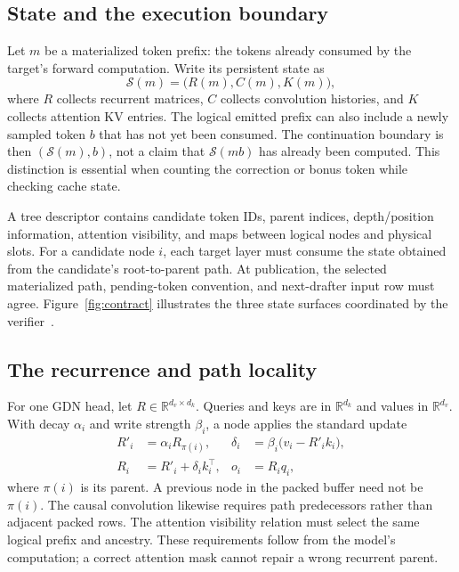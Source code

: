 \documentclass[conference]{IEEEtran}
\begin{document}
\subsection{State and the execution boundary}
Let $m$ be a materialized token prefix: the tokens already consumed by the target's forward computation. Write its persistent state as
\begin{equation}
\mathcal{S}(m)=\bigl(R(m),C(m),K(m)\bigr),
\end{equation}
where $R$ collects recurrent matrices, $C$ collects convolution histories, and $K$ collects attention KV entries. The logical emitted prefix can also include a newly sampled token $b$ that has not yet been consumed. The continuation boundary is then $(\mathcal{S}(m),b)$, not a claim that $\mathcal{S}(mb)$ has already been computed. This distinction is essential when counting the correction or bonus token while checking cache state.

A tree descriptor contains candidate token IDs, parent indices, depth/position information, attention visibility, and maps between logical nodes and physical slots. For a candidate node $i$, each target layer must consume the state obtained from the candidate's root-to-parent path. At publication, the selected materialized path, pending-token convention, and next-drafter input row must agree. Figure~\ref{fig:contract} illustrates the three state surfaces coordinated by the verifier~\cite{lumo2026stateless,lumo2026archive}.

\subsection{The recurrence and path locality}
For one GDN head, let $R\in\mathbb{R}^{d_v\times d_k}$. Queries and keys are in $\mathbb{R}^{d_k}$ and values in $\mathbb{R}^{d_v}$. With decay $\alpha_i$ and write strength $\beta_i$, a node applies the standard update~\cite{yang2024gated}
\begin{align}
R'_i &= \alpha_i R_{\pi(i)}, &
\delta_i &= \beta_i\bigl(v_i-R'_i k_i\bigr),\\
R_i &= R'_i+\delta_i k_i^\top, &
o_i &= R_iq_i,
\end{align}
where $\pi(i)$ is its parent. A previous node in the packed buffer need not be $\pi(i)$. The causal convolution likewise requires path predecessors rather than adjacent packed rows. The attention visibility relation must select the same logical prefix and ancestry. These requirements follow from the model's computation; a correct attention mask cannot repair a wrong recurrent parent.
\end{document}
